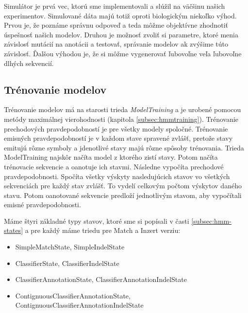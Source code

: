 Simulátor je prvá vec, ktorú sme implementovali a slúžil na väčšinu našich experimentov. Simulované dáta majú totiž oproti biologickým niekoľko výhod. Prvou je, že poznáme správnu odpoveď a teda môžme objektívne zhodnotiť úspešnosť našich modelov. Druhou je možnosť zvoliť si parametre, ktoré menia závislosť mutácií na anotácii a testovať, správanie modelov ak zvýšime túto závislosť. Ďalšou výhodou je, že si môžme vygenerovať ľubovoľne veľa ľubovoľne dlhých sekvencií.

\subsection{Trénovanie modelov}
\label{subsec:impl-model-traioning}

Trénovanie modelov má na starosti trieda \textit{ModelTraining} a je urobené pomocou metódy maximálnej vierohodnosti (kapitola \ref{subsec:hmmtraining}).
Trénovanie prechodových pravdepodobností je pre všetky modely spoločné. Trénovanie emisných pravdepodobností je v každom stave spravené zvlášť, pretože stavy emitujú rôzne symboly a jdenotlivé stavy majú rôzne spôsoby trénovania.
Trieda ModelTraining najskôr načíta model z ktorého zistí stavy.
Potom načíta trénovacie sekvencie a oanotuje ich stavmi. Následne vypočíta prechodové pravdepodobnosti. Spočíta všetky výskyty nasledujúcich stavov vo všetkých sekvenciách pre každý stav zvlášť. To vydelí celkovým počtom výskytov daného stavu. Potom oanotované sekvencie predloží jednotlivým stavom, aby vypočítali emisné pravdepodobnosti.

Máme štyri základné typy stavov, ktoré sme si popísali v časti \ref{subsec:hmm-states} a pre každý máme triedu pre Match a Inzert verziu:
\begin{itemize}
    \item SimpleMatchState, SimpleIndelState
    \item ClassifierState, ClassifierIndelState
    \item ClassifierAnnotationState, ClassifierAnnotationIndelState
    \item ContignuousClassifierAnnotationState, ContignuousClassifierAnnotationIndelState
\end{itemize}

